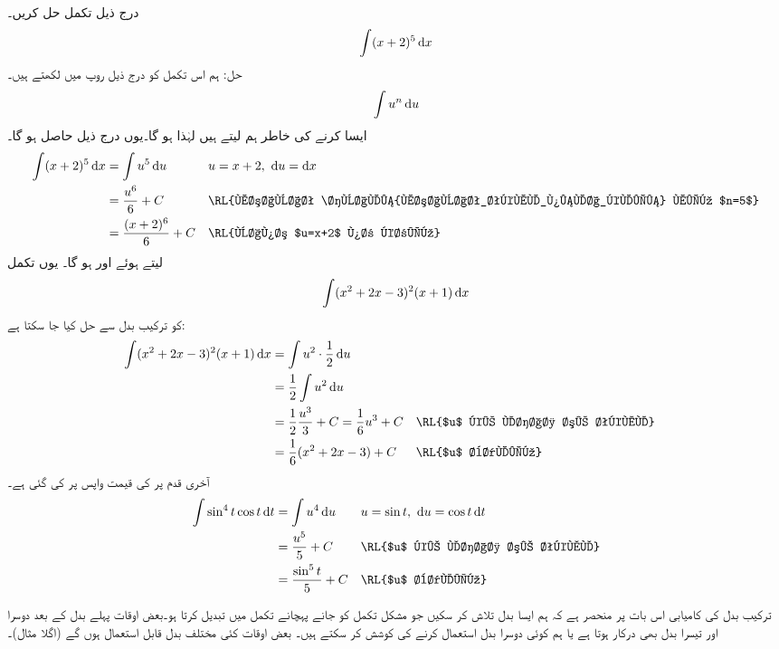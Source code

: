 درج ذیل تکمل حل کریں۔
\begin{align*}
\int(x+2)^5\dif x
\end{align*}
حل:\quad
ہم اس تکمل کو درج ذیل روپ میں لکھتے ہیں۔
\begin{align*}
\int u^n\dif u
\end{align*}
ایسا کرنے کی خاطر ہم  لیتے ہیں لہٰذا  ہو گا۔یوں درج ذیل حاصل ہو گا۔
\begin{align*}
\int (x+2)^5\dif x&=\int u^5\dif u&&u=x+2,\,\,\dif u=\dif x\\
&=\frac{u^6}{6}+C&& \text{\RL{مساوات \حوالہ{مساوات_تکمل_پہلا_کلیہ} میں $n=5$}}\\
&=\frac{(x+2)^6}{6}+C&&\text{\RL{واپس $u=x+2$ پر کریں}}
\end{align*}
 لیتے ہوئے  اور  ہو گا۔ یوں تکمل
\begin{align*}
\int (x^2+2x-3)^2(x+1)\dif x
\end{align*}
کو ترکیب بدل سے  حل کیا جا سکتا ہے:
\begin{align*}
\int (x^2+2x-3)^2(x+1)\dif x&=\int u^2\cdot \frac{1}{2}\dif u\\
&=\frac{1}{2}\int u^2\dif u\\
&=\frac{1}{2}\frac{u^3}{3}+C=\frac{1}{6}u^3+C&&\text{\RL{$u$ کے لحاظ سے تکمل}}\\
&=\frac{1}{6}(x^2+2x-3)+C&&\text{\RL{$u$ بدلیں}}
\end{align*}
آخری قدم پر  کی قیمت واپس پر کی گئی ہے۔
\begin{align*}
\int\sin^4t\cos t\dif t&=\int u^4\dif u&&u=\sin t,\,\, \dif u=\cos t\dif t\\
&=\frac{u^5}{5}+C&&\text{\RL{$u$ کے لحاظ سے تکمل}}\\
&=\frac{\sin^5t}{5}+C&&\text{\RL{$u$ بدلیں}}
\end{align*}

ترکیب بدل کی کامیابی اس بات پر منحصر ہے کہ ہم ایسا بدل تلاش کر سکیں جو مشکل تکمل کو جانے پہچانے تکمل میں تبدیل کرتا ہو۔بعض اوقات پہلے بدل کے بعد دوسرا اور تیسرا بدل بھی درکار ہوتا ہے یا ہم کوئی دوسرا بدل استعمال کرنے کی کوشش کر سکتے ہیں۔ بعض اوقات کئی مختلف بدل قابل استعمال ہوں گے (اگلا مثال)۔


